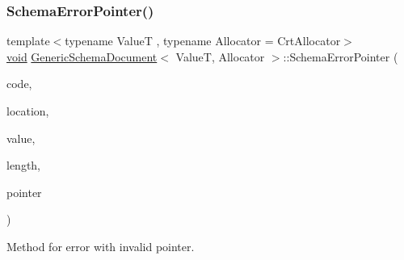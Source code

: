 \subsubsection{\texorpdfstring{Schema\+Error\+Pointer()}{SchemaErrorPointer()}}
{\footnotesize\ttfamily template$<$typename ValueT , typename Allocator  = Crt\+Allocator$>$ \\
\hyperlink{imgui__impl__opengl3__loader_8h_ac668e7cffd9e2e9cfee428b9b2f34fa7}{void} \hyperlink{classGenericSchemaDocument}{Generic\+Schema\+Document}$<$ ValueT, Allocator $>$\+::Schema\+Error\+Pointer (\begin{DoxyParamCaption}\item[{const \hyperlink{group__RAPIDJSON__ERRORS_ga64f496d2cee8c9673f3105ec6008f290}{Schema\+Error\+Code}}]{code,  }\item[{const \hyperlink{classGenericSchemaDocument_aeb62f562d4dc024402b00f97cbcef747}{Pointer\+Type} \&}]{location,  }\item[{const \hyperlink{classGenericSchemaDocument_ab1dec56a78b29649eb8e4b85b101ec7c}{Ch} $\ast$}]{value,  }\item[{\hyperlink{rapidjson_8h_a5ed6e6e67250fadbd041127e6386dcb5}{Size\+Type}}]{length,  }\item[{const \hyperlink{classGenericSchemaDocument_aeb62f562d4dc024402b00f97cbcef747}{Pointer\+Type} \&}]{pointer }\end{DoxyParamCaption})\hspace{0.3cm}{\ttfamily [inline]}}



Method for error with invalid pointer. 

\mbox{\label{classGenericSchemaDocument_a99e6557e5945ca5a003f025a33b4ac76}} 

